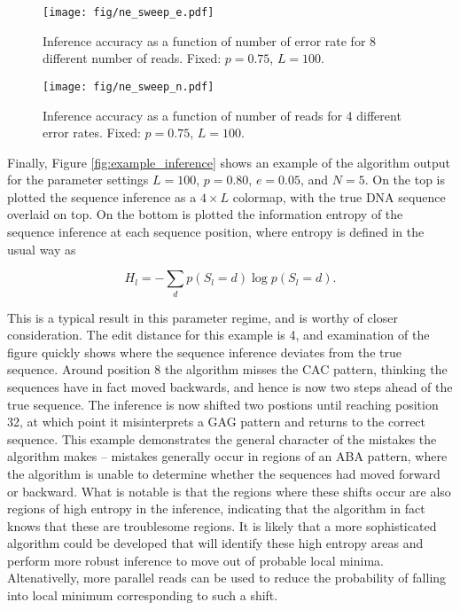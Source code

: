 \documentclass[12pt]{article}
\begin{document}
\begin{figure}
\centering
\texttt{[image: fig/ne\_sweep\_e.pdf]}
\caption{Inference accuracy as a function of number of error rate for 8 different number of reads. Fixed: $p=0.75$, $L=100$.}
\label{fig:ne_sweep_e}
\end{figure}

\begin{figure}
\centering
\texttt{[image: fig/ne\_sweep\_n.pdf]}
\caption{Inference accuracy as a function of number of reads for 4 different error rates. Fixed: $p=0.75$, $L=100$.}
\label{fig:ne_sweep_n}
\end{figure}

Finally, Figure \ref{fig:example_inference} shows an example of the algorithm output for the parameter settings $L=100$, $p=0.80$, $e=0.05$, and $N=5$. On the top is plotted the sequence inference as a $4\times L$ colormap, with the true DNA sequence overlaid on top. On the bottom is plotted the information entropy of the sequence inference at each sequence position, where entropy is defined in the usual way as

\begin{equation}
H_l = -\displaystyle\sum_{d}p(S_l=d)\log p(S_l=d).
\end{equation}

This is a typical result in this parameter regime, and is worthy of closer consideration. The edit distance for this example is 4, and examination of the figure quickly shows where the sequence inference deviates from the true sequence. Around position 8 the algorithm misses the CAC pattern, thinking the sequences have in fact moved backwards, and hence is now two steps ahead of the true sequence. The inference is now shifted two postions until reaching position 32, at which point it misinterprets a GAG pattern and returns to the correct sequence. This example demonstrates the general character of the mistakes the algorithm makes -- mistakes generally occur in regions of an ABA pattern, where the algorithm is unable to determine whether the sequences had moved forward or backward. What is notable is that the regions where these shifts occur are also regions of high entropy in the inference, indicating that the algorithm in fact knows that these are troublesome regions. It is likely that a more sophisticated algorithm could be developed that will identify these high entropy areas and perform more robust inference to move out of probable local minima. Altenativelly, more parallel reads can be used to reduce the probability of falling into local minimum corresponding to such a shift. 
\end{document}
